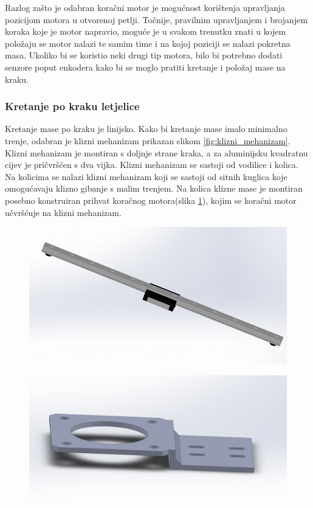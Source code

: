 \documentclass[11pt,a4paper]{article}
\begin{document}
Razlog zašto je odabran koračni motor je mogućnost korištenja upravljanja pozicijom motora u otvorenoj petlji. Točnije, pravilnim upravljanjem i brojanjem koraka koje je motor napravio, moguće je u svakom trenutku znati u kojem položaju se motor nalazi te samim time i na kojoj poziciji se nalazi pokretna masa. Ukoliko bi se koristio neki drugi tip motora, bilo bi potrebno dodati senzore poput enkodera kako bi se moglo pratiti kretanje i položaj mase na kraku.



\subsubsection{Kretanje po kraku letjelice}

Kretanje mase po kraku je linijsko. Kako bi kretanje mase imalo minimalno trenje, odabran je klizni mehanizam prikazan slikom \ref{fig:klizni_mehanizam}. Klizni mehanizam je montiran s doljnje strane kraka, a za aluminijsku kvadratnu cijev je pričvršćen s dva vijka. Klizni mehanizam se sastoji od vodilice i kolica. Na kolicima se nalazi klizni mehanizam koji se sastoji od sitnih kuglica koje omogućavaju klizno gibanje s malim trenjem. Na kolica klizne mase je montiran posebno konstruiran prihvat koračnog motora(slika \ref{fig:stepper_bracket}), kojim se koračni motor učvršćuje na klizni mehanizam.


\begin{figure}[H]
\centering
\begin{minipage}{.6\textwidth}
  \centering
  \includegraphics[width=.9\linewidth]{figures/linear_guide_7mm.png}
  \label{fig:klizni_mehanizam}
\end{minipage}%
\begin{minipage}{.4\textwidth}
  \centering
  \includegraphics[width=.9\linewidth]{figures/stepper_bracket.png}
  \label{fig:stepper_bracket}
\end{minipage}
\end{figure}
\end{document}
